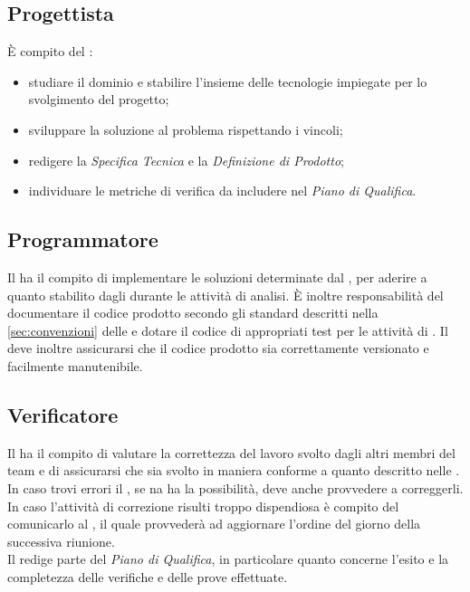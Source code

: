 \subsection{Progettista}
È compito del \Progettista:
\begin{itemize}
	\item studiare il dominio e stabilire l'insieme delle tecnologie impiegate per lo svolgimento del progetto;
	\item sviluppare la soluzione al problema rispettando i vincoli;
	\item redigere la \textit{Specifica Tecnica} e la \textit{Definizione di Prodotto};
	\item individuare le metriche di verifica da includere nel \textit{Piano di Qualifica}.
\end{itemize}

\subsection{Programmatore}
Il \Programmatore\space ha il compito di implementare le soluzioni determinate dal \Progettista, per aderire a quanto stabilito dagli \Analisti\space durante le attività di analisi. È inoltre responsabilità del \Programmatore\space documentare il codice prodotto secondo gli standard descritti nella \sezione \ref{sec:convenzioni} delle \NormeDiProgetto\space e dotare il codice di appropriati test per le attività di \VV. Il \Programmatore\space deve inoltre assicurarsi che il codice prodotto sia correttamente versionato e facilmente manutenibile.

\subsection{Verificatore}
Il \Verificatore\space ha il compito di valutare la correttezza del lavoro svolto dagli altri membri del team e di assicurarsi che sia svolto in maniera conforme a quanto descritto nelle \NormeDiProgetto. In caso trovi errori il \Verificatore, se na ha la possibilità, deve anche provvedere a correggerli. In caso l'attività di correzione risulti troppo dispendiosa è compito del \Verificatore\space comunicarlo al \Responsabile, il quale provvederà ad aggiornare l'ordine del giorno della successiva riunione.\\
Il \Verificatore\space redige parte del \textit{Piano di Qualifica}, in particolare quanto concerne l'esito e la completezza delle verifiche e delle prove effettuate.